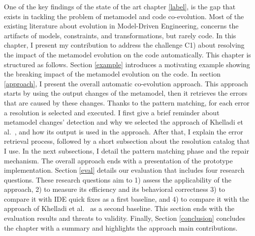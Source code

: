 One of the key findings of the state of the art chapter \ref{label}, is the gap that exists in tackling the problem of metamodel and code co-evolution. Most of the existing literature about evolution in Model-Driven Engineering, concerns the artifacts of models, constraints, and transformations, but rarely code. In this chapter, I present my contribution to address the challenge C1) about resolving the impact of the metamodel evolution on the code automatically. 
This chapter is structured as follows. Section \ref{example} introduces a motivating example showing the breaking impact of the metamodel evolution on the code. 
In section \ref{approach}, I present the overall automatic co-evolution approach. This approach starts by using the output changes of the metamodel, then it retrieves the errors that are caused by these changes. Thanks to the pattern matching, for each error a resolution is selected and executed. I first give a brief reminder about metamodel changes' detection and why we selected the approach of Khelladi et al.~\cite{k?}, and how its output is used in the approach. After that, I explain the error retrieval process, followed by a short subsection about the resolution catalog that I use. In the next subsections, I detail the pattern matching phase and the repair mechanism. The overall approach ends with a presentation of the prototype implementation.
Section \ref{eval} details our evaluation that includes four research questions. These research questions aim to 1) assess the applicability of the approach, 2) to measure its efficiency and its behavioral correctness 3) to compare it with IDE quick fixes as a first baseline, and 4) to compare it with the approach of Khelladi et al.~\cite{??} as a second baseline. This section ends with the evaluation results and threats to validity. Finally, Section \ref{conclusion} concludes the chapter with a summary and highlights the approach main contributions. %
